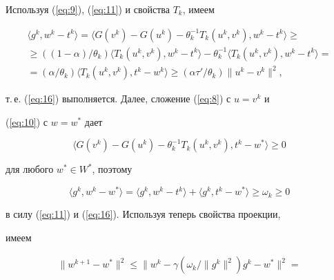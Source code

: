 \begin{pf}


Используя (\ref{eq:9}), (\ref{eq:11}) и свойства $T_{k} $, имеем


\begin{multline*}


\langle g^{k}, w^{k} - t^{k} \rangle=


\langle G(v^{k}) - G(u^{k}) - \theta_{k}^{-1} T_{k}


(u^{k}, v^{k}), w^{k} - t^{k} \rangle \ge \\


%


\geq((1-\alpha) / \theta_{k}) \langle T_{k}(u^{k}, v^{k}),


w^{k} - t^{k} \rangle 


 - \theta_{k}^{-1} \langle T_{k}(u^{k}, v^{k}), w^{k} - t^{k} \rangle=\\


%


=(\alpha / \theta_{k})\langle T_{k}(u^{k}, v^{k}), t^{k} - w^{k} \rangle


\geq(\alpha \tau' / \theta_{k}) \| u^{k} - v^{k} \|^{2}, 


\end{multline*}


т.\,е. (\ref{eq:16}) выполняется. Далее, сложение (\ref{eq:8}) с $u=v^{k}$ и 


(\ref{eq:10}) с $w=w^{*}$ дает


$$


\langle G(v^{k}) - G(u^{k}) -


\theta_{k}^{-1} T_{k}(u^{k}, v^{k}), t^{k} - w^{*} \rangle \geq 0


$$


для любого $w^{*} \in W^{*}$, поэтому


$$


\langle g^{k}, w^{k} - w^{*} \rangle=\langle g^{k}, w^{k} - t^{k} \rangle+


\langle g^{k}, t^{k} - w^{*} \rangle \geq \omega_{k} \geq 0


$$


в силу (\ref{eq:11}) и (\ref{eq:16}). Используя теперь свойства проекции, 


имеем 


\begin{multline*}


\| w^{k+1} - w^{*} \|^{2} \leq  \| w^{k} - 


\gamma(\omega_{k} / \| g^{k} \|^{2}) g^{k} - w^{*} \|^{2} =\\



\end{multline*}
\end{pf}
